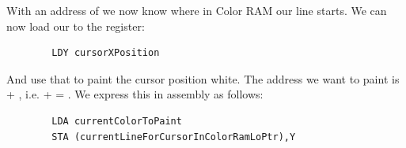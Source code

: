 With an address of  we now know where in Color RAM our line starts. We can now load our  to the
 register:
\begin{lstlisting}
        LDY cursorXPosition
\end{lstlisting}
And use that to paint the cursor position white. The address we want to paint is  + 
, i.e.  +  = . We express this in assembly as follows:
\begin{lstlisting}
        LDA currentColorToPaint
        STA (currentLineForCursorInColorRamLoPtr),Y
\end{lstlisting}






